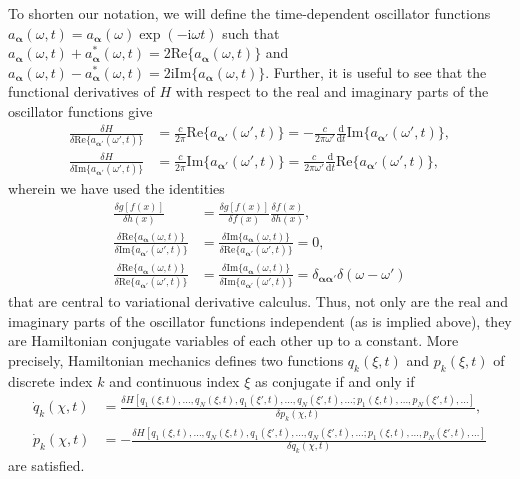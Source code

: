 \documentclass{article}
\numberwithin{equation}{section}
\begin{document}
To shorten our notation, we will define the time-dependent oscillator functions $a_{\bm{\alpha}}(\omega,t) = a_{\bm{\alpha}}(\omega)\exp(-\mathrm{i}\omega t)$ such that $a_{\bm{\alpha}}(\omega,t) + a_{\bm{\alpha}}^*(\omega,t) = 2\mathrm{Re}\{a_{\bm{\alpha}}(\omega,t)\}$ and $a_{\bm{\alpha}}(\omega,t) - a_{\bm{\alpha}}^*(\omega,t) = 2\mathrm{i}\mathrm{Im}\{a_{\bm{\alpha}}(\omega,t)\}$. Further, it is useful to see that the functional derivatives of $H$ with respect to the real and imaginary parts of the oscillator functions give
\begin{equation}
\begin{split}
\frac{\delta H}{\delta \mathrm{Re}\{a_{\bm{\alpha}'}(\omega',t)\}} &= \frac{c}{2\pi}\mathrm{Re}\{a_{\bm{\alpha}'}(\omega',t)\} = -\frac{c}{2\pi\omega'}\frac{\mathrm{d}}{\mathrm{d}t}\mathrm{Im}\{a_{\bm{\alpha}'}(\omega',t)\},\\
\frac{\delta H}{\delta \mathrm{Im}\{a_{\bm{\alpha}'}(\omega',t)\}} &= \frac{c}{2\pi}\mathrm{Im}\{a_{\bm{\alpha}'}(\omega',t)\} = \frac{c}{2\pi\omega'}\frac{\mathrm{d}}{\mathrm{d}t}\mathrm{Re}\{a_{\bm{\alpha}'}(\omega',t)\},
\end{split}
\end{equation}
wherein we have used the identities
\begin{equation}
\begin{split}
\frac{\delta g[f(x)]}{\delta h(x)} &= \frac{\delta g[f(x)]}{\delta f(x)}\frac{\delta f(x)}{\delta h(x)},\\
\frac{\delta \mathrm{Re}\{a_{\bm{\alpha}}(\omega,t)\}}{\delta\mathrm{Im}\{a_{\bm{\alpha}'}(\omega',t)\}} &= \frac{\delta \mathrm{Im}\{a_{\bm{\alpha}}(\omega,t)\}}{\delta\mathrm{Re}\{a_{\bm{\alpha}'}(\omega',t)\}} = 0,\\
\frac{\delta \mathrm{Re}\{a_{\bm{\alpha}}(\omega,t)\}}{\delta\mathrm{Re}\{a_{\bm{\alpha}'}(\omega',t)\}} &= \frac{\delta \mathrm{Im}\{a_{\bm{\alpha}}(\omega,t)\}}{\delta\mathrm{Im}\{a_{\bm{\alpha}'}(\omega',t)\}} = \delta_{\bm{\alpha\alpha}'}\delta(\omega - \omega')
\end{split}
\end{equation}
that are central to variational derivative calculus. Thus, not only are the real and imaginary parts of the oscillator functions independent (as is implied above), they are Hamiltonian conjugate variables of each other up to a constant. More precisely, Hamiltonian mechanics defines two functions $q_k(\xi,t)$ and $p_k(\xi,t)$ of discrete index $k$ and continuous index $\xi$ as conjugate if and only if
\begin{equation}\label{eq:conjugateRules}
\begin{split}
\dot{q}_k(\chi,t) &= \frac{\delta H[q_1(\xi,t),\ldots,q_N(\xi,t),q_1(\xi',t),\ldots,q_N(\xi',t),\ldots;p_1(\xi,t),\ldots,p_N(\xi',t),\ldots]}{\delta p_k(\chi,t)},\\
\dot{p}_k(\chi,t) &= -\frac{\delta H[q_1(\xi,t),\ldots,q_N(\xi,t),q_1(\xi',t),\ldots,q_N(\xi',t),\ldots;p_1(\xi,t),\ldots,p_N(\xi',t),\ldots]}{\delta q_k(\chi,t)}
\end{split}
\end{equation}
are satisfied.
\end{document}
